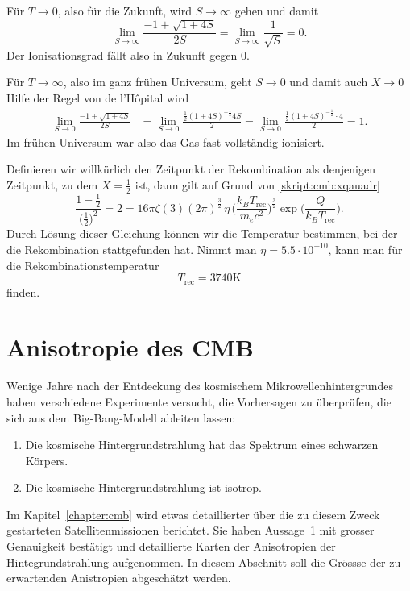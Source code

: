 Für $T\to 0$, also für die Zukunft, wird $S\to \infty$ gehen
und damit
\[
\lim_{S\to\infty}\frac{-1+\sqrt{1+4S}}{2S}
=
\lim_{S\to\infty}\frac{1}{\sqrt{S}}
=
0.
\]
Der Ionisationsgrad fällt also in Zukunft gegen 0.

Für $T\to\infty$, also im ganz frühen Universum, geht $S\to 0$
und damit auch $X\to 0$
Hilfe der Regel von de l'H\^opital wird
\begin{align*}
\lim_{S\to 0}\frac{-1+\sqrt{1+4S}}{2S}
&=
\lim_{S\to 0}
\frac{\frac12(1+4S)^{-\frac12} 4S}{2}
=
\lim_{S\to 0}
\frac{\frac12(1+4S)^{-\frac12}\cdot 4}{2}
=
1.
\end{align*}
Im frühen Universum war also das Gas fast vollständig ionisiert.

Definieren wir willkürlich den Zeitpunkt der Rekombination als
denjenigen Zeitpunkt, zu dem $X=\frac12$ ist, dann gilt auf Grund
von \eqref{skript:cmb:xqauadr}
\[
\frac{1-\frac12}{\bigl(\frac12\bigr)^2}
=
2
=
16\pi\zeta(3)(2\pi)^{\frac32}
\,
\eta
\,
\biggl(\frac{k_BT_\text{rec}}{m_ec^2}\biggr)^{\frac32}
\exp\biggl( \frac{Q}{k_BT_\text{rec}} \biggr).
\]
Durch Lösung dieser Gleichung können wir die Temperatur bestimmen,
bei der die Rekombination stattgefunden hat.
Nimmt man $\eta=5.5\cdot 10^{-10}$, kann man für die Rekombinationstemperatur
\[
T_\text{rec} = 3740\text{K}
\]
finden.

\section{Anisotropie des CMB}
Wenige Jahre nach der Entdeckung des kosmischem Mikrowellenhintergrundes
haben verschiedene Experimente versucht, die Vorhersagen zu überprüfen,
die sich aus dem Big-Bang-Modell ableiten lassen:
\begin{enumerate}
\item Die kosmische Hintergrundstrahlung hat das Spektrum eines schwarzen
Körpers.
\item Die kosmische Hintergrundstrahlung ist isotrop.
\end{enumerate}
Im Kapitel~\ref{chapter:cmb} wird etwas detaillierter über die zu diesem
Zweck gestarteten Satellitenmissionen berichtet.
Sie haben Aussage~1 mit grosser Genauigkeit bestätigt und detaillierte
Karten der Anisotropien der Hintegrundstrahlung aufgenommen.
In diesem Abschnitt soll die Grössse der zu erwartenden Anistropien
abgeschätzt werden.

